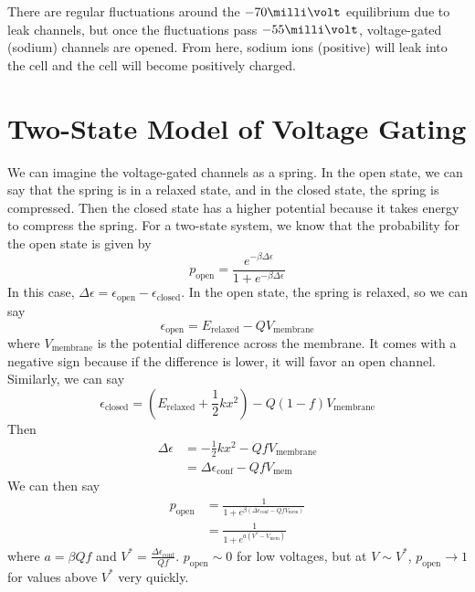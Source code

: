 \documentclass[a4paper,twoside,master.tex]{subfiles}
\begin{document}
There are regular fluctuations around the $ -70\milli\volt $ equilibrium due to leak channels, but once the fluctuations pass $ -55\milli\volt $, voltage-gated (sodium) channels are opened. From here, sodium ions (positive) will leak into the cell and the cell will become positively charged.

\section{Two-State Model of Voltage Gating}\label{sec:two-state_model_of_voltage_gating}

We can imagine the voltage-gated channels as a spring. In the open state, we can say that the spring is in a relaxed state, and in the closed state, the spring is compressed. Then the closed state has a higher potential because it takes energy to compress the spring. For a two-state system, we know that the probability for the open state is given by
\begin{equation}
    p_{\text{open}} = \frac{e^{- \beta \Delta \epsilon}}{1 + e^{- \beta \Delta \epsilon}}
\end{equation}
In this case, $ \Delta \epsilon = \epsilon_{\text{open}} - \epsilon_{\text{closed}} $. In the open state, the spring is relaxed, so we can say
\begin{equation}
    \epsilon_{\text{open}} = E_{\text{relaxed}} - Q V_{\text{membrane}}
\end{equation}
where $ V_{\text{membrane}} $ is the potential difference across the membrane. It comes with a negative sign because if the difference is lower, it will favor an open channel. Similarly, we can say
\begin{equation}
    \epsilon_{\text{closed}} = \left( E_{\text{relaxed}} + \frac{1}{2} k x^2 \right) - Q (1-f) V_{\text{membrane}}
\end{equation}
Then
\begin{align}
    \Delta \epsilon &= - \frac{1}{2} k x^2 - Q f V_{\text{membrane}} \\
                    &= \Delta \epsilon_{\text{conf}} - Q f V_{\text{mem}}
\end{align}
We can then say
\begin{align}
    p_{\text{open}} &= \frac{1}{1 + e^{\beta (\Delta \epsilon_{\text{conf}} - Q f V_{\text{mem}})}} \\
                    &= \frac{1}{1 + e^{a(V^* - V_{\text{mem}})}}
\end{align}
where $ a = \beta Qf $ and $ V^* = \frac{\Delta \epsilon_{\text{conf}}}{Qf} $. $ p_{\text{open}} \sim 0 $ for low voltages, but at $ V \sim V^* $, $ p_{\text{open}} \to 1 $ for values above $ V^* $ very quickly.
\end{document}
